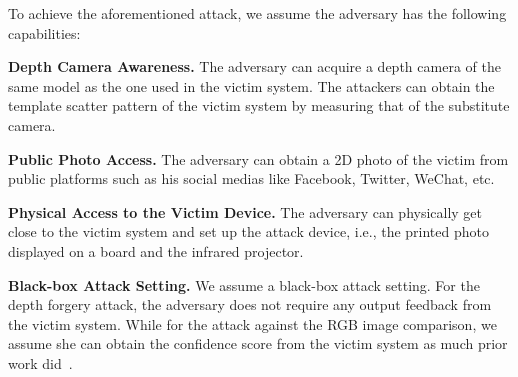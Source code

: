 To achieve the aforementioned attack, we assume the adversary has the following capabilities:

\textbf{Depth Camera Awareness.}
The adversary can acquire a depth camera of the same model as the one used in the victim system. The attackers can obtain the template scatter pattern of the victim system by measuring that of the substitute camera.


\textbf{Public Photo Access.}
The adversary can obtain a  2D photo of the victim from  public platforms such as his social medias like Facebook, Twitter, WeChat, etc.

\textbf{Physical Access to the Victim Device.} The adversary can physically get close to the victim system and set up the attack device, i.e., the printed photo displayed on a board and the infrared projector.


\textbf{Black-box Attack Setting.} 
We assume a black-box attack setting. For the depth forgery attack, the adversary does not require any output feedback from the victim system. While for the attack against the RGB image comparison, we assume she can obtain the  confidence score from the victim system as much prior work did~\cite{guo2019simple}.



